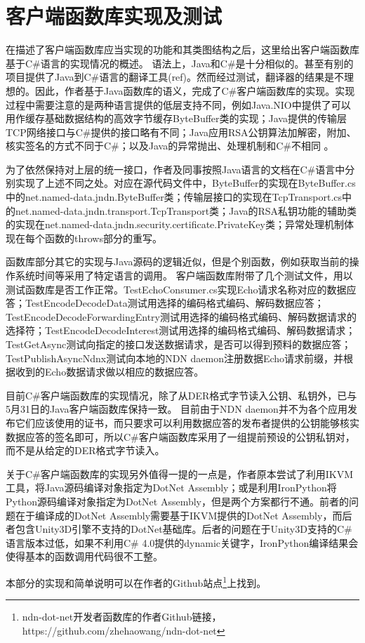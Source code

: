 \section{客户端函数库实现及测试}
\par
在描述了客户端函数库应当实现的功能和其类图结构之后，这里给出客户端函数库基于C\#语言的实现情况的概述。
语法上，Java和C\#是十分相似的。甚至有别的项目提供了Java到C\#语言的翻译工具(ref)。然而经过测试，翻译器的结果是不理想的。因此，作者基于Java函数库的语义，完成了C\#客户端函数库的实现。实现过程中需要注意的是两种语言提供的低层支持不同，例如Java.NIO中提供了可以用作缓存基础数据结构的高效字节缓存ByteBuffer类的实现；Java提供的传输层TCP网络接口与C\#提供的接口略有不同；Java应用RSA公钥算法加解密，附加、核实签名的方式不同于C\#；以及Java的异常抛出、处理机制和C\#不相同 。
\par
为了依然保持对上层的统一接口，作者及同事按照Java语言的文档在C\#语言中分别实现了上述不同之处。对应在源代码文件中，ByteBuffer的实现在ByteBuffer.cs中的net.named-data.jndn.ByteBuffer类；传输层接口的实现在TcpTransport.cs中的net.named-data.jndn.transport.TcpTransport类；Java的RSA私钥功能的辅助类的实现在net.named-data.jndn.security.certificate.PrivateKey类；异常处理机制体现在每个函数的throws部分的重写。
\par
函数库部分其它的实现与Java源码的逻辑近似，但是个别函数，例如获取当前的操作系统时间等采用了特定语言的调用。
客户端函数库附带了几个测试文件，用以测试函数库是否工作正常。TestEchoConsumer.cs实现Echo请求名称对应的数据应答；TestEncodeDecodeData测试用选择的编码格式编码、解码数据应答；TestEncodeDecodeForwardingEntry测试用选择的编码格式编码、解码数据请求的选择符；TestEncodeDecodeInterest测试用选择的编码格式编码、解码数据请求；TestGetAsync测试向指定的接口发送数据请求，是否可以得到预料的数据应答；TestPublishAsyncNdnx测试向本地的NDN daemon注册数据Echo请求前缀，并根据收到的Echo数据请求做以相应的数据应答。
\par
目前C\#客户端函数库的实现情况，除了从DER格式字节读入公钥、私钥外，已与5月31日的Java客户端函数库保持一致。 目前由于NDN daemon并不为各个应用发布它们应该使用的证书，而只要求可以利用数据应答的发布者提供的公钥能够核实数据应答的签名即可，所以C\#客户端函数库采用了一组提前预设的公钥私钥对，而不是从给定的DER格式字节读入。
\par
关于C\#客户端函数库的实现另外值得一提的一点是，作者原本尝试了利用IKVM工具，将Java源码编译对象指定为DotNet Assembly；或是利用IronPython将Python源码编译对象指定为DotNet Assembly，但是两个方案都行不通。前者的问题在于编译成的DotNet Assembly需要基于IKVM提供的DotNet Assembly，而后者包含Unity3D引擎不支持的DotNet基础库。后者的问题在于Unity3D支持的C\#语言版本过低，如果不利用C\# 4.0提供的dynamic关键字，IronPython编译结果会使得基本的函数调用代码很不工整。
\par
本部分的实现和简单说明可以在作者的Github站点\footnote{ndn-dot-net开发者函数库的作者Github链接，https://github.com/zhehaowang/ndn-dot-net}上找到。
